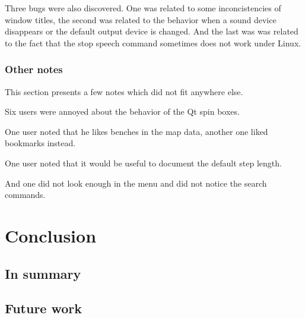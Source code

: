 \documentclass[nolof,digital]{fithesis3}
\begin{document}
Three bugs were also discovered. One was related to some inconcistencies of window titles, the second was related to the behavior when a sound device disappears or the default output device is changed. And the last was was related to the fact that the stop speech command sometimes does not work under Linux.
\subsection{Other notes}
This section presents a few notes which did not fit anywhere else.

Six users were annoyed about the behavior of the Qt spin boxes.

One user noted that he likes benches in the map data, another one liked bookmarks instead.

One user noted that it would be useful to document the default step length.

And one did not look enough in the menu and did not notice the search commands.
\chapter{Conclusion}
\section{In summary}
\section{Future work}
\end{document}
